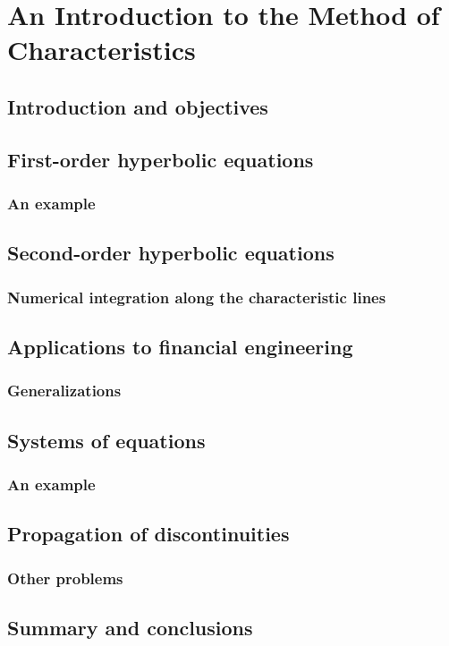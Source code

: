 \chapter{An Introduction to the Method of Characteristics}

\section{Introduction and objectives}

\section{First-order hyperbolic equations}

\subsection{An example}

\section{Second-order hyperbolic equations}

\subsection{Numerical integration along the characteristic lines}

\section{Applications to financial engineering}

\subsection{Generalizations}

\section{Systems of equations}

\subsection{An example}

\section{Propagation of discontinuities}

\subsection{Other problems}

\section{Summary and conclusions}